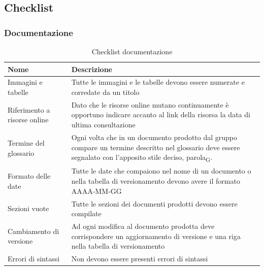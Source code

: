 \documentclass[a4paper,12pt]{article}
\begin{document}
        


        \subsection{Checklist}
            \subsubsection{Documentazione}
                \begin{longtable}{|M{3.5cm}|M{8.5cm}|}

                    \caption{Checklist documentazione} \\
                    \hline
                    \textbf{Nome} & \textbf{Descrizione} \\
                    \hline
                    \endhead

                    Immagini e tabelle & Tutte le immagini e le tabelle devono essere numerate e corredate da un titolo \\
                    \hline

                    Riferimento a risorse online & Dato che le risorse online mutano continuamente è opportuno indicare accanto al link della risorsa la data di ultima consultazione \\
                    \hline

                    Termine del glossario & Ogni volta che in un documento prodotto dal gruppo compare un termine descritto nel glossario deve essere segnalato con l’apposito stile deciso, parola\textsubscript{G}.\\
                    \hline

                    Formato delle date & Tutte le date che compaiono nel nome di un documento o nella tabella di versionamento devono avere il formato AAAA-MM-GG \\
                    \hline

                    Sezioni vuote & Tutte le sezioni dei documenti prodotti devono essere compilate \\
                    \hline

                    Cambiamento di versione & Ad ogni modifica al documento prodotta deve corrispondere un aggiornamento di versione e una riga nella tabella di versionamento \\
                    \hline

                    Errori di sintassi & Non devono essere presenti errori di sintassi \\
                    \hline


\end{longtable}
\end{document}

